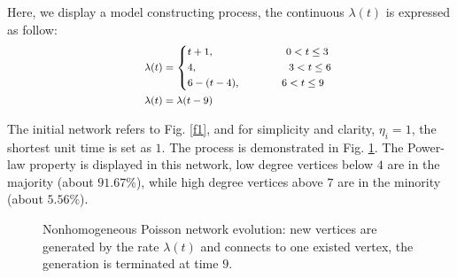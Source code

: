 \documentclass[final]{IEEEtran}
\begin{document}
Here, we display a model constructing process, the continuous
$\lambda(t)$ is expressed as follow:
\begin{equation}\label{e32}\footnotesize
\begin{aligned}
&\hspace{0.5cm}\lambda(t)=  \left\{
   \begin{aligned}
   &t+1, \hspace{2.05cm} 0<t\leq3\\
&4, \hspace{2.6cm} 3<t\leq6\\
&6-(t-4), \hspace{1.18cm} 6<t\leq9\\
   \end{aligned}
   \right.
\\
&\hspace{0.5cm}\lambda(t)= \lambda(t-9)
\end{aligned}
  \end{equation}


The initial network refers to Fig. \ref{f1}, and for simplicity
and clarity, $\eta_{i}=1$, the shortest unit time is set as $1$.
The process is demonstrated in Fig. \ref{f4}. The Power-law
property is displayed in this network, low degree vertices below
$4$ are in the majority (about $91.67\%$), while high degree
vertices above $7$ are in the minority (about $5.56\%$).

\begin{figure}[!htp]
\centering
\caption{\label{f4}Nonhomogeneous Poisson network evolution: new
vertices are generated by the rate $\lambda (t)$ and connects to
one existed vertex, the generation is terminated at time $9$.}
\end{figure}

\end{document}
